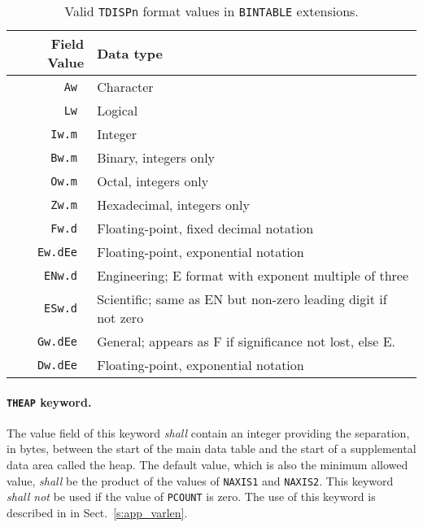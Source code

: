 \documentclass[onecolumn]{aa}
\begin{document}
\begin{table*}
\begin{center}
\caption{Valid {\tt TDISPn} format values in {\tt BINTABLE} extensions.}
\label{t:tabD}
\begin{tabular}{rl} 
\hline \hline
Field Value & Data type \\
\hline
        \tt Aw     &  Character                                  \\
        \tt Lw     &  Logical                                    \\
        \tt Iw.m   &  Integer                                    \\
        \tt Bw.m   &  Binary, integers only                       \\
        \tt Ow.m   &  Octal, integers only                        \\
        \tt Zw.m   &  Hexadecimal, integers only                  \\
        \tt Fw.d   &  Floating-point, fixed decimal notation       \\
        \tt Ew.dEe &  Floating-point, exponential notation \\
        \tt ENw.d  &  Engineering; E format with exponent multiple of three \\
        \tt ESw.d  &  Scientific; same as EN but non-zero leading digit 
			if not zero \\
        \tt Gw.dEe &  General; appears as F if significance not lost, else E. \\
        \tt Dw.dEe &  Floating-point, exponential notation  \\
\hline
\end{tabular}
\end{center}
\end{table*}


   \paragraph{{\tt THEAP} keyword.}
   The value field of this keyword {\em shall} contain 
   an integer providing the separation, in bytes, between the start 
   of the main data table and the start of a 
   supplemental data area called the 
   heap.  The default value, which is also the minimum allowed value,
   {\em shall} be the product 
   of the values of {\tt NAXIS1} and {\tt NAXIS2}.  
   This keyword {\em shall not}
   be used if the value of {\tt PCOUNT} is zero.  The use of this
   keyword is described in in Sect.\ \ref{s:app_varlen}.
\end{document}
